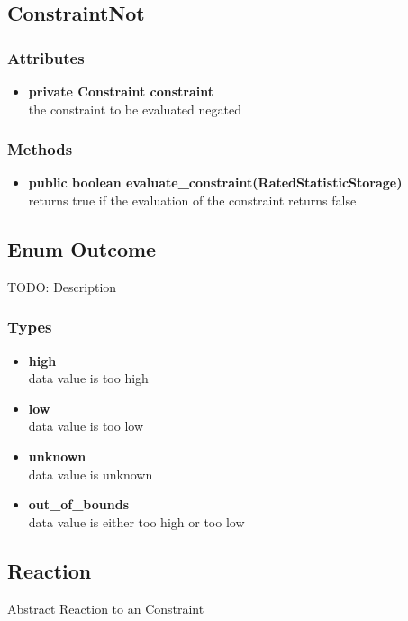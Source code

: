 \subsection{ConstraintNot }

\subsubsection{Attributes}
\begin{itemize}
	\item \textbf{ private Constraint constraint }\\
	the constraint to be evaluated negated
\end{itemize}
\subsubsection{Methods}
\begin{itemize}
	\item \textbf{ public boolean evaluate\_constraint(RatedStatisticStorage) }\\
	returns true if the evaluation of the constraint returns false
\end{itemize}

\subsection{Enum Outcome }
TODO: Description

\subsubsection{Types}
\begin{itemize}
	\item \textbf{ high }\\
	data value is too high
	\item \textbf{ low }\\
	data value is too low
	\item \textbf{ unknown }\\
	data value is unknown
	\item \textbf{ out\_of\_bounds }\\
	data value is either too high or too low
\end{itemize}


\subsection{Reaction}
	Abstract Reaction to an Constraint
